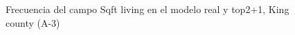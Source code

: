 \begin{figure}[H]
    \centering
    
    \caption{Frecuencia del campo Sqft living en el modelo real y top2+1, King county (A-3)}
    \label{frecuency-top2+1-sqft living}
\end{figure}